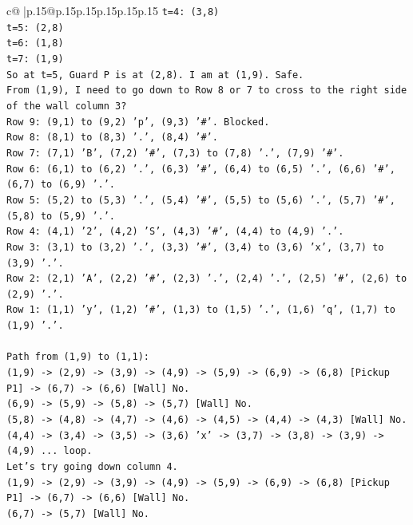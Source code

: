 \documentclass{article}
\begin{document}
{\begin{supertabular}{c@{$\;$}|p{.15\linewidth}@{}p{.15\linewidth}p{.15\linewidth}p{.15\linewidth}p{.15\linewidth}p{.15\linewidth}}
{{{\texttt{t=4: (3,8)} \\
\texttt{t=5: (2,8)} \\
\texttt{t=6: (1,8)} \\
\texttt{t=7: (1,9)} \\
\texttt{So at t=5, Guard P is at (2,8). I am at (1,9). Safe.} \\
\texttt{From (1,9), I need to go down to Row 8 or 7 to cross to the right side of the wall column 3?} \\
\texttt{Row 9: (9,1) to (9,2) 'p', (9,3) '\#'. Blocked.} \\
\texttt{Row 8: (8,1) to (8,3) '.', (8,4) '\#'.} \\
\texttt{Row 7: (7,1) 'B', (7,2) '\#', (7,3) to (7,8) '.', (7,9) '\#'.} \\
\texttt{Row 6: (6,1) to (6,2) '.', (6,3) '\#', (6,4) to (6,5) '.', (6,6) '\#', (6,7) to (6,9) '.'.} \\
\texttt{Row 5: (5,2) to (5,3) '.', (5,4) '\#', (5,5) to (5,6) '.', (5,7) '\#', (5,8) to (5,9) '.'.} \\
\texttt{Row 4: (4,1) '2', (4,2) 'S', (4,3) '\#', (4,4) to (4,9) '.'.} \\
\texttt{Row 3: (3,1) to (3,2) '.', (3,3) '\#', (3,4) to (3,6) 'x', (3,7) to (3,9) '.'.} \\
\texttt{Row 2: (2,1) 'A', (2,2) '\#', (2,3) '.', (2,4) '.', (2,5) '\#', (2,6) to (2,9) '.'.} \\
\texttt{Row 1: (1,1) 'y', (1,2) '\#', (1,3) to (1,5) '.', (1,6) 'q', (1,7) to (1,9) '.'.} \\
\\ 
\texttt{Path from (1,9) to (1,1):} \\
\texttt{(1,9) {-}> (2,9) {-}> (3,9) {-}> (4,9) {-}> (5,9) {-}> (6,9) {-}> (6,8) {[}Pickup P1{]} {-}> (6,7) {-}> (6,6) {[}Wall{]} No.} \\
\texttt{(6,9) {-}> (5,9) {-}> (5,8) {-}> (5,7) {[}Wall{]} No.} \\
\texttt{(5,8) {-}> (4,8) {-}> (4,7) {-}> (4,6) {-}> (4,5) {-}> (4,4) {-}> (4,3) {[}Wall{]} No.} \\
\texttt{(4,4) {-}> (3,4) {-}> (3,5) {-}> (3,6) 'x' {-}> (3,7) {-}> (3,8) {-}> (3,9) {-}> (4,9) ... loop.} \\
\texttt{Let's try going down column 4.} \\
\texttt{(1,9) {-}> (2,9) {-}> (3,9) {-}> (4,9) {-}> (5,9) {-}> (6,9) {-}> (6,8) {[}Pickup P1{]} {-}> (6,7) {-}> (6,6) {[}Wall{]} No.} \\
\texttt{(6,7) {-}> (5,7) {[}Wall{]} No.} \\
}}}
\end{supertabular}}
\end{document}
